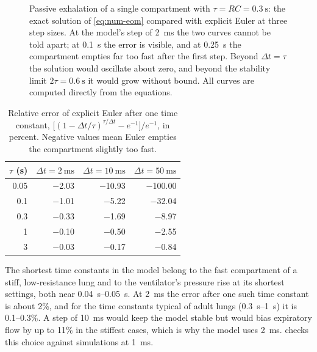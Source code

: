 \begin{figure}[ht]
\centering

\caption{Passive exhalation of a single compartment with $\tau = RC = \SI{0.3}{\second}$: the exact solution of \cref{eq:num-eom} compared with explicit Euler at three step sizes. At the model's step of \SI{2}{\milli\second} the two curves cannot be told apart; at \SI{0.1}{\second} the error is visible, and at \SI{0.25}{\second} the compartment empties far too fast after the first step. Beyond $\Delta t = \tau$ the solution would oscillate about zero, and beyond the stability limit $2\tau = \SI{0.6}{\second}$ it would grow without bound. All curves are computed directly from the equations.}
\label{fig:num-euler}
\end{figure}

\begin{table}[ht]
\centering
\caption{Relative error of explicit Euler after one time constant, $\bigl[(1-\Delta t/\tau)^{\tau/\Delta t} - e^{-1}\bigr]/e^{-1}$, in percent. Negative values mean Euler empties the compartment slightly too fast.}
\label{tab:num-err}
\small
\begin{tabular}{@{}rrrr@{}}
\toprule
$\tau$ (s) & $\Delta t = \SI{2}{\milli\second}$ & $\Delta t = \SI{10}{\milli\second}$ & $\Delta t = \SI{50}{\milli\second}$ \\
\midrule
0.05 & $-$2.03 & $-$10.93 & $-$100.00 \\
0.1 & $-$1.01 & $-$5.22 & $-$32.04 \\
0.3 & $-$0.33 & $-$1.69 & $-$8.97 \\
1 & $-$0.10 & $-$0.50 & $-$2.55 \\
3 & $-$0.03 & $-$0.17 & $-$0.84 \\
\bottomrule
\end{tabular}
\end{table}

The shortest time constants in the model belong to the fast compartment of a stiff, low-resistance lung and to the ventilator's pressure rise at its shortest settings, both near \SIrange{0.04}{0.05}{\second}. At \SI{2}{\milli\second} the error after one such time constant is about 2\%, and for the time constants typical of adult lungs (\SIrange{0.3}{1}{\second}) it is 0.1--0.3\%. A step of \SI{10}{\milli\second} would keep the model stable but would bias expiratory flow by up to 11\% in the stiffest cases, which is why the model uses \SI{2}{\milli\second}.  checks this choice against simulations at \SI{1}{\milli\second}.

